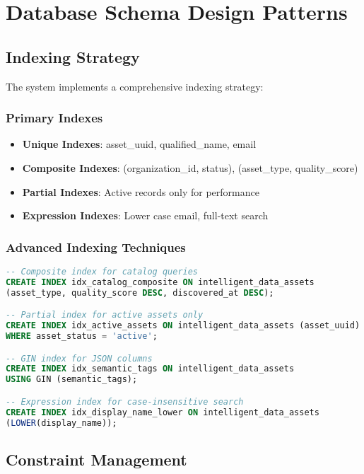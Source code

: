 \section{Database Schema Design Patterns}

\subsection{Indexing Strategy}

The system implements a comprehensive indexing strategy:

\subsubsection{Primary Indexes}
\begin{itemize}
    \item \textbf{Unique Indexes}: asset\_uuid, qualified\_name, email
    \item \textbf{Composite Indexes}: (organization\_id, status), (asset\_type, quality\_score)
    \item \textbf{Partial Indexes}: Active records only for performance
    \item \textbf{Expression Indexes}: Lower case email, full-text search
\end{itemize}

\subsubsection{Advanced Indexing Techniques}
\begin{lstlisting}[language=SQL, caption=Advanced Index Examples]
-- Composite index for catalog queries
CREATE INDEX idx_catalog_composite ON intelligent_data_assets 
(asset_type, quality_score DESC, discovered_at DESC);

-- Partial index for active assets only
CREATE INDEX idx_active_assets ON intelligent_data_assets (asset_uuid) 
WHERE asset_status = 'active';

-- GIN index for JSON columns
CREATE INDEX idx_semantic_tags ON intelligent_data_assets 
USING GIN (semantic_tags);

-- Expression index for case-insensitive search
CREATE INDEX idx_display_name_lower ON intelligent_data_assets 
(LOWER(display_name));
\end{lstlisting}

\subsection{Constraint Management}

